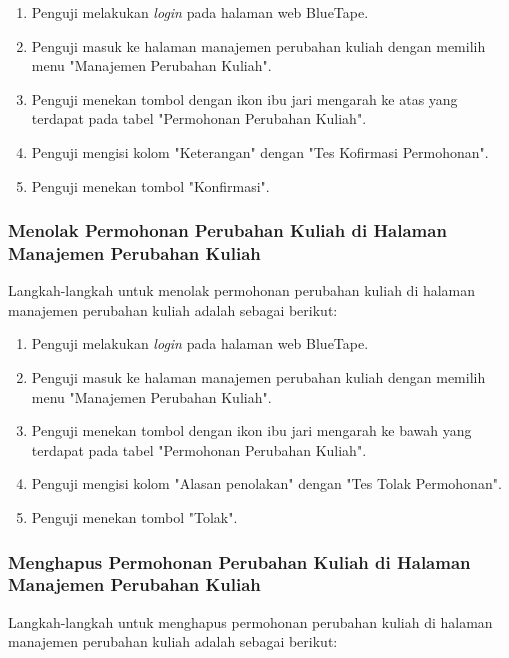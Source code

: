\begin{enumerate}
    \item Penguji melakukan \textit{login} pada halaman web BlueTape.
    \item Penguji masuk ke halaman manajemen perubahan kuliah dengan memilih menu "Manajemen Perubahan Kuliah".
    \item Penguji menekan tombol dengan ikon ibu jari mengarah ke atas yang terdapat pada tabel "Permohonan Perubahan Kuliah".
    \item Penguji mengisi kolom "Keterangan" dengan "Tes Kofirmasi Permohonan".
    \item Penguji menekan tombol "Konfirmasi".
\end{enumerate}

\subsubsection{Menolak Permohonan Perubahan Kuliah di Halaman Manajemen Perubahan Kuliah}
\label{subsubsec:skenario_menolak_permohonan_perubahan_kuliah_di_halaman_manajemen_perubahan_kuliah}
Langkah-langkah untuk menolak permohonan perubahan kuliah di halaman manajemen perubahan kuliah adalah sebagai berikut:

\begin{enumerate}
    \item Penguji melakukan \textit{login} pada halaman web BlueTape.
    \item Penguji masuk ke halaman manajemen perubahan kuliah dengan memilih menu "Manajemen Perubahan Kuliah".
    \item Penguji menekan tombol dengan ikon ibu jari mengarah ke bawah yang terdapat pada tabel "Permohonan Perubahan Kuliah".
    \item Penguji mengisi kolom "Alasan penolakan" dengan "Tes Tolak Permohonan".
    \item Penguji menekan tombol "Tolak".
\end{enumerate}

\subsubsection{Menghapus Permohonan Perubahan Kuliah di Halaman Manajemen Perubahan Kuliah}
\label{subsubsec:skenario_menghapus_permohonan_perubahan_kuliah_di_halaman_manajemen_perubahan_kuliah}
Langkah-langkah untuk menghapus permohonan perubahan kuliah di halaman manajemen perubahan kuliah adalah sebagai berikut:

